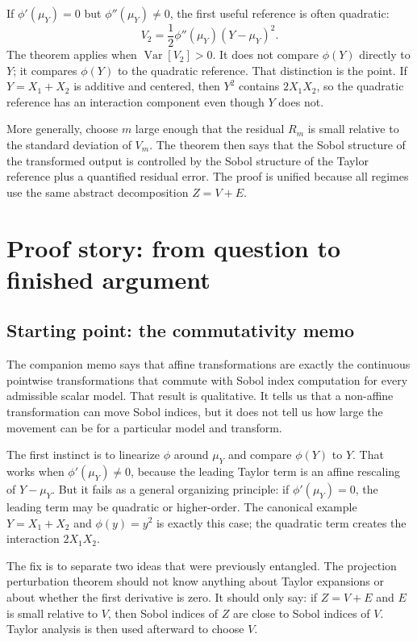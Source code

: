 \documentclass[11pt,letterpaper]{article}
\DeclareMathOperator{\Var}{Var}
\theoremstyle{remark}
\begin{document}
If $\phi'(\mu_Y)=0$ but $\phi''(\mu_Y)\neq0$, the first useful reference is often
quadratic:
\begin{equation}
  V_2=\frac12\phi''(\mu_Y)(Y-\mu_Y)^2.
\end{equation}
The theorem applies when $\Var[V_2]>0$. It does not compare $\phi(Y)$ directly to
$Y$; it compares $\phi(Y)$ to the quadratic reference. That distinction is the
point. If $Y=X_1+X_2$ is additive and centered, then $Y^2$ contains
$2X_1X_2$, so the quadratic reference has an interaction component even though
$Y$ does not.

More generally, choose $m$ large enough that the residual $R_m$ is small relative
to the standard deviation of $V_m$. The theorem then says that the Sobol
structure of the transformed output is controlled by the Sobol structure of the
Taylor reference plus a quantified residual error. The proof is unified because
all regimes use the same abstract decomposition $Z=V+E$.

\section{Proof story: from question to finished argument}
\label{app:proof_story}

\subsection*{Starting point: the commutativity memo}

The companion memo says that affine transformations are exactly the continuous
pointwise transformations that commute with Sobol index computation for every
admissible scalar model. That result is qualitative. It tells us that a
non-affine transformation can move Sobol indices, but it does not tell us how
large the movement can be for a particular model and transform.

The first instinct is to linearize $\phi$ around $\mu_Y$ and compare $\phi(Y)$ to
$Y$. That works when $\phi'(\mu_Y)\neq0$, because the leading Taylor term is an
affine rescaling of $Y-\mu_Y$. But it fails as a general organizing principle:
if $\phi'(\mu_Y)=0$, the leading term may be quadratic or higher-order. The
canonical example $Y=X_1+X_2$ and $\phi(y)=y^2$ is exactly this case; the
quadratic term creates the interaction $2X_1X_2$.

The fix is to separate two ideas that were previously entangled. The projection
perturbation theorem should not know anything about Taylor expansions or about
whether the first derivative is zero. It should only say: if $Z=V+E$ and $E$ is
small relative to $V$, then Sobol indices of $Z$ are close to Sobol indices of
$V$. Taylor analysis is then used afterward to choose $V$.
\end{document}
